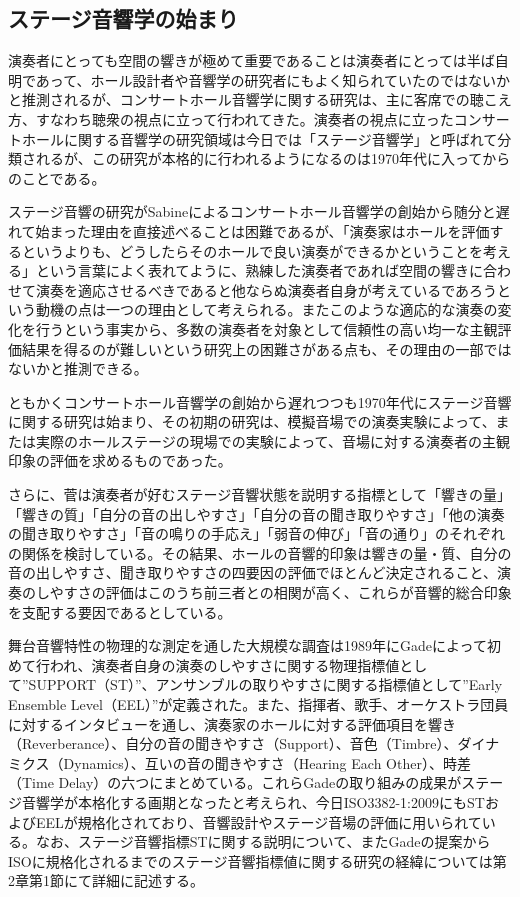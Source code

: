 \documentclass[11pt,a4j]{jreport}
\begin{document}
\subsection*{ステージ音響学の始まり}
演奏者にとっても空間の響きが極めて重要であることは演奏者にとっては半ば自明であって、ホール設計者や音響学の研究者にもよく知られていたのではないかと推測されるが、コンサートホール音響学に関する研究は、主に客席での聴こえ方、すなわち聴衆の視点に立って行われてきた。演奏者の視点に立ったコンサートホールに関する音響学の研究領域は今日では「ステージ音響学」と呼ばれて分類されるが、この研究が本格的に行われるようになるのは1970年代に入ってからのことである。

ステージ音響の研究がSabineによるコンサートホール音響学の創始から随分と遅れて始まった理由を直接述べることは困難であるが、「演奏家はホールを評価するというよりも、どうしたらそのホールで良い演奏ができるかということを考える」という言葉\cite{橘1997}によく表れてように、熟練した演奏者であれば空間の響きに合わせて演奏を適応させるべきであると他ならぬ演奏者自身が考えているであろうという動機の点は一つの理由として考えられる。またこのような適応的な演奏の変化を行うという事実から、多数の演奏者を対象として信頼性の高い均一な主観評価結果を得るのが難しいという研究上の困難さがある点も、その理由の一部ではないかと推測できる。
  
ともかくコンサートホール音響学の創始から遅れつつも1970年代にステージ音響に関する研究は始まり、その初期の研究は、模擬音場での演奏実験によって\cite{marhsall1978, nakayama1984, naylor1988}、または実際のホールステージの現場での実験によって\cite{Gade1989II, chiang2003, jeon2005}、音場に対する演奏者の主観印象の評価を求めるものであった。

さらに、菅\cite{suga1986}は演奏者が好むステージ音響状態を説明する指標として「響きの量」「響きの質」「自分の音の出しやすさ」「自分の音の聞き取りやすさ」「他の演奏の聞き取りやすさ」「音の鳴りの手応え」「弱音の伸び」「音の通り」のそれぞれの関係を検討している。その結果、ホールの音響的印象は響きの量・質、自分の音の出しやすさ、聞き取りやすさの四要因の評価でほとんど決定されること、演奏のしやすさの評価はこのうち前三者との相関が高く、これらが音響的総合印象を支配する要因であるとしている。

舞台音響特性の物理的な測定を通した大規模な調査は1989年にGade\cite{Gade1989II}によって初めて行われ、演奏者自身の演奏のしやすさに関する物理指標値として”SUPPORT（ST）”、アンサンブルの取りやすさに関する指標値として”Early Ensemble Level（EEL）”が定義された。また、指揮者、歌手、オーケストラ団員に対するインタビューを通し、演奏家のホールに対する評価項目を響き（Reverberance）、自分の音の聞きやすさ（Support）、音色（Timbre）、ダイナミクス（Dynamics）、互いの音の聞きやすさ（Hearing Each Other）、時差（Time Delay）の六つにまとめている。これらGadeの取り組みの成果がステージ音響学が本格化する画期となったと考えられ、今日ISO3382-1:2009にもSTおよびEELが規格化されており、音響設計やステージ音場の評価に用いられている。なお、ステージ音響指標STに関する説明について、またGadeの提案からISOに規格化されるまでのステージ音響指標値に関する研究の経緯については第2章第1節にて詳細に記述する。
\end{document}
